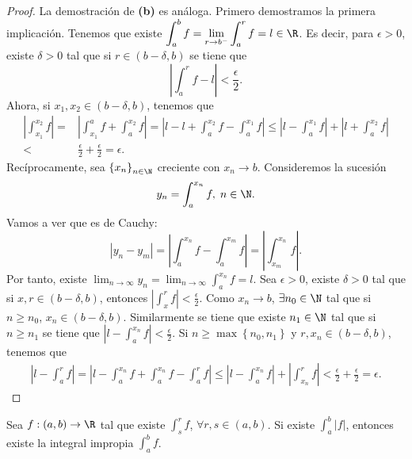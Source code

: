 \begin{proof}
La demostración de \textbf{(b)} es análoga. Primero demostramos la primera implicación. Tenemos que existe $\displaystyle \int^{b}_{a} f = \lim_{r \to b^{-}}\int^{r}_{a} f = l \in \R $. Es decir, para $\displaystyle \epsilon > 0 $, existe $\displaystyle \delta > 0 $ tal que si $\displaystyle r \in \left(b-\delta,b\right) $ se tiene que 
	\[ \left|\int^{r}_{a} f -l\right| < \frac{\epsilon }{2} .\]
Ahora, si $\displaystyle x_{1}, x_{2} \in \left(b-\delta, b\right) $, tenemos que 
\[
\begin{split}
	\left|\int^{x_{2}}_{x_{1}} f \right| = & \left|\int^{a}_{x_{1}} f +\int^{x_{2}}_{a} f \right| = \left|l - l + \int^{x_{2}}_{a} f -\int^{x_{1}}_{a} f \right|\leq \left|l - \int^{x_{1}}_{a} f \right| + \left|l + \int^{x_{2}}_{a} f \right| \\
	< & \frac{\epsilon }{2} + \frac{\epsilon }{2} = \epsilon .
\end{split}
\]
Recíprocamente, sea $\displaystyle \left\{ x_{n}\right\} _{n\in\N} $ creciente con $\displaystyle x_{n} \to b $. Consideremos la sucesión
\[y_{n} = \int^{x_{n}}_{a} f, \; n \in \N .\]
Vamos a ver que es de Cauchy:
\[ \left|y_{n}-y_{m}\right| = \left|\int^{x_{n}}_{a} f - \int^{x_{m}}_{a} f \right| = \left|\int^{x_{n}}_{x_{m}} f\right|.\]
Por tanto, existe $\displaystyle \lim_{n \to \infty}y_{n} = \lim_{n \to \infty}\int^{x_{n}}_{a} f=l $. Sea $\displaystyle \epsilon > 0 $, existe $\displaystyle \delta > 0 $ tal que si $\displaystyle x,r \in \left(b-\delta, b\right) $, entonces $\displaystyle \left|\int^{r}_{x} f \right| < \frac{\epsilon }{2} $. Como $\displaystyle x_{n} \to b $, $\displaystyle \exists n_{0} \in\N $ tal que si $\displaystyle n \geq n_{0} $, $\displaystyle x_{n} \in \left(b-\delta, b\right) $.
Similarmente se tiene que existe $\displaystyle n_{1} \in \N $ tal que si $\displaystyle n \geq n_{1} $ se tiene que $\displaystyle \left|l - \int^{x_{n}}_{a} f \right|<\frac{\epsilon }{2} $. 
Si $\displaystyle n \geq \max \left\{ n_{0}, n_{1}\right\}  $ y $\displaystyle r,x_{n} \in \left(b-\delta, b\right) $, tenemos que
\[
\begin{split}
	\left|l - \int^{r}_{a} f \right| =  \left|l - \int^{x_{n}}_{a} f + \int^{x_{n}}_{a} f -\int^{r}_{a} f \right| \leq \left|l - \int^{x_{n}}_{a} f \right|+ \left|\int^{r}_{x_{n}} f \right| < \frac{\epsilon }{2} + \frac{\epsilon }{2} = \epsilon  .
\end{split}
\]
\end{proof}
\begin{ftheorem}[]
\normalfont Sea $\displaystyle f: \left(a,b\right) \to \R $ tal que existe $\displaystyle \int^{r}_{s} f $, $\displaystyle \forall r,s \in \left(a,b\right) $. Si existe $\displaystyle \int^{b}_{a} \left|f\right|  $, entonces existe la integral impropia $\displaystyle \int^{b}_{a} f $.
\end{ftheorem}
